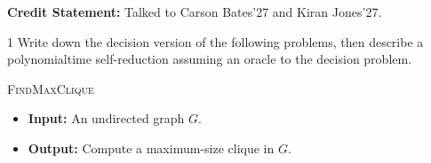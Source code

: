 \documentclass[12pt]{article}
\begin{document}


\textbf{Credit Statement:} Talked to Carson Bates'27 and Kiran Jones'27.

\begin{problem}{1}
    Write down the decision version of the following problems, then describe a polynomialtime self-reduction assuming an oracle to the decision problem.
     \begin{tcolorbox}
            \textsc{FindMaxClique}
            \begin{itemize}
                \item \textbf{Input:} An undirected graph $G$. 
                \item \textbf{Output:} Compute a maximum-size clique in $G$.
            \end{itemize}
        \end{tcolorbox}
\end{problem}
\end{document}
